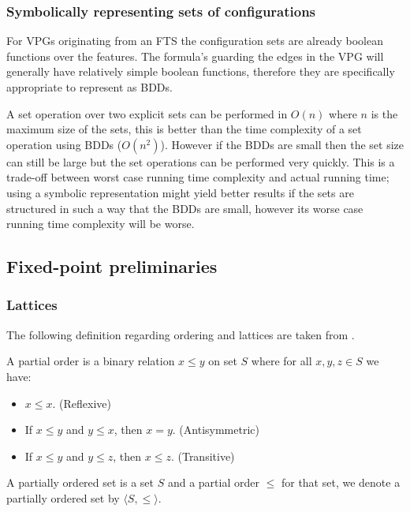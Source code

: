 \subsubsection{Symbolically representing sets of configurations}
\label{sec:symrepconfs}
For VPGs originating from an FTS the configuration sets are already boolean functions over the features. The formula's guarding the edges in the VPG will generally have relatively simple boolean functions, therefore they are specifically appropriate to represent as BDDs.

A set operation over two explicit sets can be performed in $O(n)$ where $n$ is the maximum size of the sets, this is better than the time complexity of a set operation using BDDs ($O(n^2)$). However if the BDDs are small then the set size can still be large but the set operations can be performed very quickly. This is a trade-off between worst case running time complexity and actual running time; using a symbolic representation might yield better results if the sets are structured in such a way that the BDDs are small, however its worse case running time complexity will be worse.

\subsection{Fixed-point preliminaries}
\subsubsection{Lattices}
The following definition regarding ordering and lattices are taken from \cite{birkhoff1940lattice}.
\begin{definition}
	A partial order is a binary relation $x \leq y$ on set $S$ where for all $x,y,z \in S$ we have:
	\begin{itemize}
		\item $x \leq x$. (Reflexive)
		\item If $x \leq y$ and $y \leq x$, then $x=y$. (Antisymmetric)
		\item If $x \leq y$ and $y \leq z$, then $x \leq z$. (Transitive)
	\end{itemize}
\end{definition}

\begin{definition}
	A partially ordered set is a set $S$ and a partial order $\leq$ for that set, we denote a partially ordered set by $\langle S, \leq \rangle$.
\end{definition}

